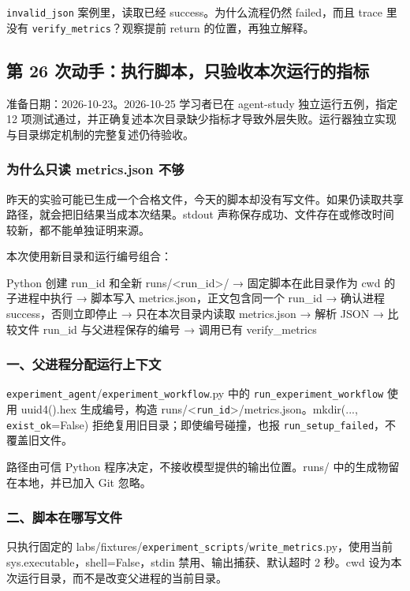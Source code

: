 \nolinkurl{invalid_json} 案例里，读取已经 success。为什么流程仍然 failed，而且 trace 里没有 \nolinkurl{verify_metrics}？观察提前 return 的位置，再独立解释。

\subsection{第 26 次动手：执行脚本，只验收本次运行的指标}

准备日期：2026-10-23。2026-10-25 学习者已在 agent-study 独立运行五例，指定 12 项测试通过，并正确复述本次目录缺少指标才导致外层失败。运行器独立实现与目录绑定机制的完整复述仍待验收。

\subsubsection{为什么只读 metrics.json 不够}

昨天的实验可能已生成一个合格文件，今天的脚本却没有写文件。如果仍读取共享路径，就会把旧结果当成本次结果。stdout 声称保存成功、文件存在或修改时间较新，都不能单独证明来源。

本次使用新目录和运行编号组合：

\begin{Code}
Python 创建 run_id 和全新 runs/<run_id>/
  → 固定脚本在此目录作为 cwd 的子进程中执行
  → 脚本写入 metrics.json，正文包含同一个 run_id
  → 确认进程 success，否则立即停止
  → 只在本次目录内读取 metrics.json
  → 解析 JSON
  → 比较文件 run_id 与父进程保存的编号
  → 调用已有 verify_metrics
\end{Code}

\subsubsection{一、父进程分配运行上下文}

\nolinkurl{experiment_agent}/\nolinkurl{experiment_workflow}.py 中的 \nolinkurl{run_experiment_workflow} 使用 uuid4().hex 生成编号，构造 runs/<\nolinkurl{run_id}>/metrics.json。mkdir(..., \nolinkurl{exist_ok}=False) 拒绝复用旧目录；即使编号碰撞，也报 \nolinkurl{run_setup_failed}，不覆盖旧文件。

路径由可信 Python 程序决定，不接收模型提供的输出位置。runs/ 中的生成物留在本地，并已加入 Git 忽略。

\subsubsection{二、脚本在哪写文件}

只执行固定的 labs/fixtures/\nolinkurl{experiment_scripts}/\nolinkurl{write_metrics}.py，使用当前 sys.executable，shell=False，stdin 禁用、输出捕获、默认超时 2 秒。cwd 设为本次运行目录，而不是改变父进程的当前目录。

